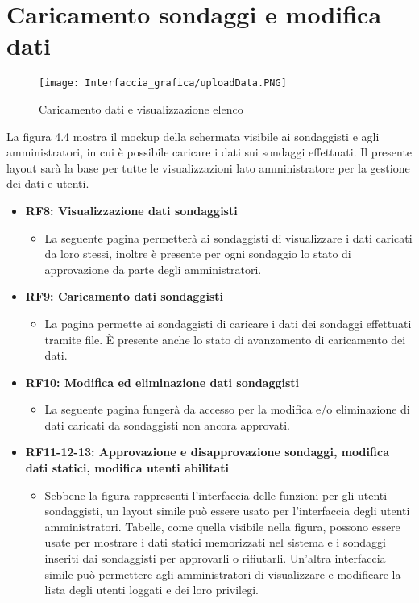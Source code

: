 \section{Caricamento sondaggi e modifica dati}
    \label{fig:4.4}
    \begin{figure}[H]
        \center
        \texttt{[image: Interfaccia\_grafica/uploadData.PNG]}
        \caption{Caricamento dati e visualizzazione elenco}
    \end{figure} 
    La figura 4.4 mostra il mockup della schermata visibile ai sondaggisti e agli amministratori, in cui è possibile caricare i dati sui sondaggi effettuati.\newline
    Il presente layout sarà la base per tutte le visualizzazioni lato amministratore per la gestione dei dati e utenti.
    \begin{itemize}
        \item \textbf{RF8: Visualizzazione dati sondaggisti} \begin{itemize}
            \item La seguente pagina permetterà ai sondaggisti di visualizzare i dati caricati da loro stessi, inoltre è presente per ogni sondaggio lo stato di approvazione da parte degli amministratori.
        \end{itemize}
        \item \textbf{RF9: Caricamento dati sondaggisti} \begin{itemize}
            \item La pagina permette ai sondaggisti di caricare i dati dei sondaggi effettuati tramite file. È presente anche lo stato di avanzamento di caricamento dei dati.
        \end{itemize}
        \item \textbf{RF10: Modifica ed eliminazione dati sondaggisti} \begin{itemize}
            \item La seguente pagina fungerà da accesso per la modifica e/o eliminazione di dati caricati da sondaggisti non ancora approvati.
        \end{itemize}
        \item \textbf{RF11-12-13: Approvazione e disapprovazione sondaggi, modifica dati statici, modifica utenti abilitati} \begin{itemize}
            \item Sebbene la figura rappresenti l'interfaccia delle funzioni per gli utenti sondaggisti, un layout simile può essere usato per l'interfaccia degli utenti amministratori. Tabelle, come quella visibile nella figura, possono essere usate per mostrare i dati statici memorizzati nel sistema e i sondaggi inseriti dai sondaggisti per approvarli o rifiutarli. Un'altra interfaccia simile può permettere agli amministratori di visualizzare e modificare la lista degli utenti loggati e dei loro privilegi.

\end{itemize}
\end{itemize}
